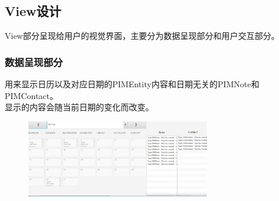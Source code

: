 \documentclass[a4paper]{article}
\begin{document}
\subsection{View设计}
    View部分呈现给用户的视觉界面，主要分为数据呈现部分和用户交互部分。\\
    \subsubsection{数据呈现部分}
        用来显示日历以及对应日期的PIMEntity内容和日期无关的PIMNote和PIMContact。\\
        显示的内容会随当前日期的变化而改变。\\
        \begin{figure}[h]
            \centering
            \includegraphics[width=8cm]{SYNC2.png}\\
        \end{figure}
\end{document}
